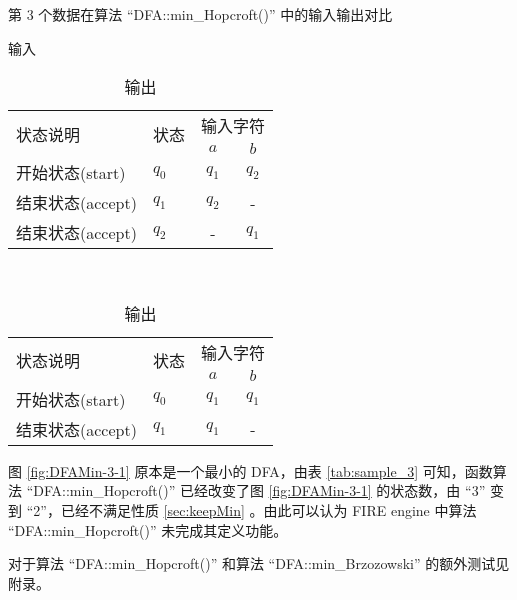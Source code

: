 \begin{table}[!htbp]
    \caption{第 3 个数据在算法 “DFA::min\_Hopcroft()” 中的输入输出对比 }
    \label{tab:sample_3}
    \centering
    \small%
    \setlength{\tabcolsep}{4pt}%
    \renewcommand{\arraystretch}{1.2}%
    \begin{subtable}[t]{0.45\textwidth}
        \centering
        \caption{输入}
        \label{tab:sample_3_origin}
        \begin{tabular}{l p{2em}<{\centering} c c}
            \toprule%
            \multirow{2}{*}{状态说明} & \multirow{2}{*}{状态} & \multicolumn{2}{c}{输入字符} \\
            \cline{3-4}      &    &$a$ & $b$  \\
            \midrule%
            开始状态(start)  & $q_0$ & $q_1$   & $q_2$   \\
            结束状态(accept) & $q_1$ & $q_2$   &     -   \\
            结束状态(accept) & $q_2$ & -       & $q_1$   \\
            \bottomrule%
        \end{tabular}
    \end{subtable}
    ~%
    \begin{subtable}[t]{0.45\textwidth}
        \centering
        \caption{输出}
        \label{tab:sample_3_result}
        \begin{tabular}{l p{2em}<{\centering} c c }
            \toprule%
            \multirow{2}{*}{状态说明} & \multirow{2}{*}{状态} & \multicolumn{2}{c}{输入字符} \\
            \cline{3-4}      &    & $a$ & $b$  \\
            \midrule%
            开始状态(start)  & $q_0$ & $q_1$   & $q_1$   \\
            结束状态(accept) & $q_1$ & $q_1$   & -   \\
            \bottomrule%
        \end{tabular}
    \end{subtable}
\end{table}

图 \ref{fig:DFAMin-3-1} 原本是一个最小的 DFA，由表 \ref{tab:sample_3} 可知，函数算法 “DFA::min\_Hopcroft()” 已经改变了图 \ref{fig:DFAMin-3-1} 的状态数，由 “3” 变到 “2”，已经不满足性质 \ref{sec:keepMin} 。由此可以认为 FIRE engine 中算法 “DFA::min\_Hopcroft()” 未完成其定义功能。

对于算法 “DFA::min\_Hopcroft()” 和算法 “DFA::min\_Brzozowski” 的额外测试见附录。
